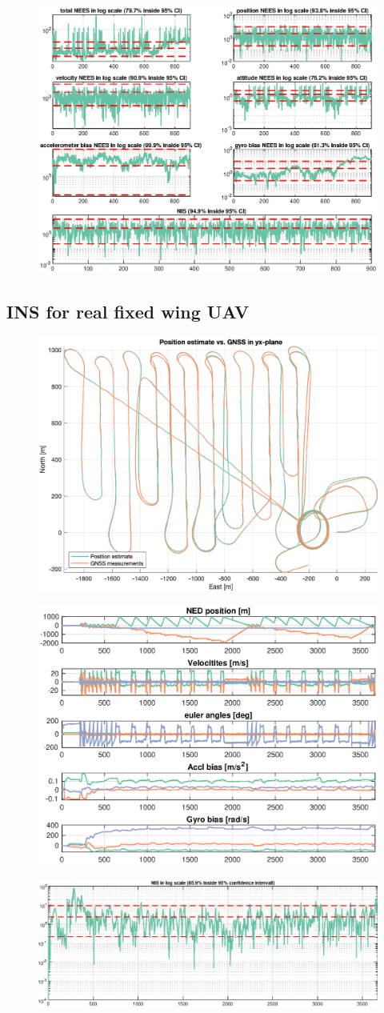 \begin{figure}[!htb]
    \centering
    \includegraphics[width=0.6\linewidth]{figures/ga_2/sim_consistency.eps}
    \caption{}
    \label{fig:ga_2_sim_consistency}
\end{figure}

\subsection{INS for real fixed wing UAV}
\begin{figure}[!htb]
    \centering
    \includegraphics[width=0.6\linewidth]{figures/ga_2/real_trajectory.eps}
    \caption{}
    \label{fig:ga_2_real_trajectory}
\end{figure}

\begin{figure}[!htb]
    \centering
    \includegraphics[width=0.6\linewidth]{figures/ga_2/real_state.eps}
    \caption{}
    \label{fig:ga_2_real_state}
\end{figure}

\begin{figure}[!htb]
    \centering
    \includegraphics[width=0.6\linewidth]{figures/ga_2/real_consistency.eps}
    \caption{}
    \label{fig:ga_2_real_consistency}
\end{figure}